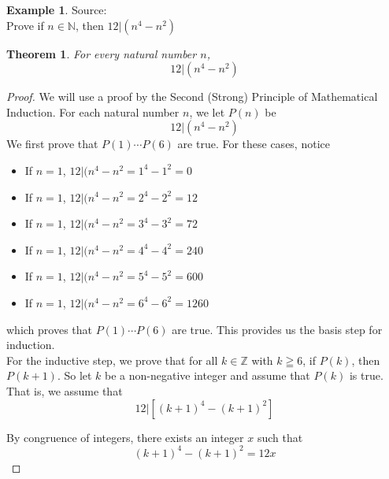 \documentclass{book}
\newtheorem{theorem}{Theorem}[section]
\theoremstyle{definition}
\newtheorem{example}{Example}[definition]
\theoremstyle{remark}
\newcommand{\bb}[1]{\mathbb{#1}}
\begin{document}
\newpage
\begin{example}
Source: \cite[C.10]{Hammack} \\ 

Prove if $n \in \bb{N}$, then $12 | (n^4 - n^2)$
\begin{tcolorbox}
    \begin{theorem}
        For every natural number $n$,
        \begin{equation*}
            12 | (n^4 - n^2)            
        \end{equation*}
    \end{theorem}
\end{tcolorbox}

\begin{proof}
    We will use a proof by the Second (Strong) Principle of Mathematical Induction. For each natural number $n$, we let $P(n)$ be
        \begin{equation*}
            12 | (n^4 - n^2)
        \end{equation*}
    We first prove that $P(1) \cdots P(6)$ are true. For these cases, notice
        \begin{itemize}
            \item If $n=1$, $12 | (n^4 - n^2 = 1^4 - 1^2 =0$
            \item If $n=1$, $12 | (n^4 - n^2 = 2^4 - 2^2 =12$
            \item If $n=1$, $12 | (n^4 - n^2 = 3^4 - 3^2 =72$
            \item If $n=1$, $12 | (n^4 - n^2 = 4^4 - 4^2 =240$
            \item If $n=1$, $12 | (n^4 - n^2 = 5^4 - 5^2 =600$
            \item If $n=1$, $12 | (n^4 - n^2 = 6^4 - 6^2 =1260$
        \end{itemize}

    which proves that $P(1) \cdots P(6)$ are true. This provides us the basis step for induction. \\ 
    
    For the inductive step, we prove that for all $k \in \bb{Z}$ with $k \geqq 6$, if $P(k)$, then $P(k+1)$. So let $k$ be a non-negative integer and assume that $P(k)$ is true. That is, we assume that 
        \begin{equation*}
            12 | [(k+1)^4 - (k+1)^2]
        \end{equation*}
    
    By congruence of integers, there exists an integer $x$ such that
        \begin{equation}
        \label{dsf1} 
            (k+1)^4 - (k+1)^2 = 12x
        \end{equation}
    

\end{proof}
\end{example}
\end{document}
